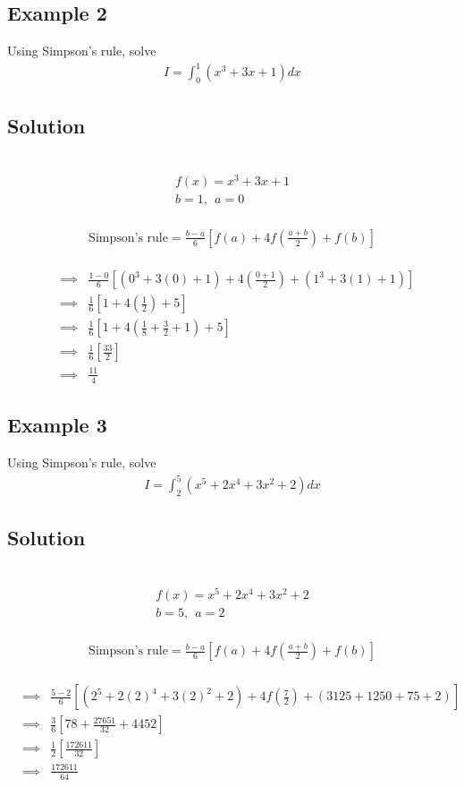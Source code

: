 \documentclass[12pt]{report}
\newcommand{\sps}{\\[0.2cm]}
\begin{document}
	
	\subsection{Example 2}
	Using Simpson's rule, solve
	\begin{eqnarray*}
		I = \int_0^1\left(x^3 +3x + 1\right)dx
	\end{eqnarray*}
	
	\subsection*{Solution}
	{~}\\[-2.1cm]
	\begin{gather*}
		f(x) = x^3 +3x + 1\sps
		b=1,~~ a=0
	\end{gather*}
	{~}\\[-2.1cm]
	\begin{gather*}
		\text{Simpson's rule} = \frac{b-a}{6}\left[f(a)+ 4f\left(\frac{a+b}{2}\right) + f(b)\right]
	\end{gather*}
	{~}\\[-2.1cm]
	\begin{eqnarray*}
		&\implies&\frac{1-0}{6}\left[(0^3 + 3(0) + 1) + 4(\frac{0+1}{2})+ (1^3 + 3(1) + 1)\right]\sps
		&\implies& \frac{1}{6}\left[1+4\left(\frac{1}{2}\right)+5\right]\sps
		&\implies&\frac{1}{6}\left[1+4\left(\frac{1}{8}+\frac{3}{2}+1\right)+5\right]\sps
		&\implies&\frac{1}{6}\left[\frac{33}{2}\right]\sps
		&\implies& \frac{11}{4}
	\end{eqnarray*}
	
	
	\subsection{Example 3}
	Using Simpson's rule, solve
	\begin{eqnarray*}
		I = \int_2^5\left(x^5 + 2x^4 + 3x^2 + 2\right)dx
	\end{eqnarray*}
	
	\subsection*{Solution}
	{~}\\[-1.9cm]
	\begin{gather*}
		f(x) = x^5 + 2x^4 + 3x^2 + 2\\[-0.2cm]
		b=5,~~ a=2
	\end{gather*}
	{~}\\[-1.9cm]
	\begin{gather*}
		\text{Simpson's rule} = \frac{b-a}{6}\left[f(a)+ 4f\left(\frac{a+b}{2}\right) + f(b)\right]
	\end{gather*}
	{~}\\[-1.5cm]
	\begin{eqnarray*}
		&\implies& \frac{5-2}{6}\left[(2^5 + 2(2)^4 + 3(2)^2 + 2) + 4f\left(\frac{7}{2}\right) + (3125+1250+75+2)\right]\sps
		&\implies&\frac{3}{6}\left[78+\frac{27651}{32}+ 4452\right]\sps
		&\implies& \frac{1}{2}\left[\frac{172611}{32}\right]\sps
		&\implies& \frac{172611}{64}
	\end{eqnarray*}
\end{document}
